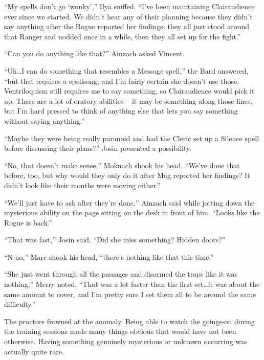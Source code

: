 “My spells don’t go ‘wonky’,” Ilya sniffed. “I’ve been maintaining Clairaudience ever since we started. We didn’t hear any of their planning because they didn’t say anything after the Rogue reported her findings: they all just stood around that Ranger and nodded once in a while, then they all set up for the fight.”

 

“Can you do anything like that?” Ainzach asked Vincent.

 

“Uh…I can do something that resembles a Message spell,” the Bard answered, “but that requires a spellsong, and I’m fairly certain she doesn’t use those. Ventriloquism still requires me to say something, so Clairaudience would pick it up. There are a lot of oratory abilities – it may be something along those lines, but I’m hard pressed to think of anything else that lets you say something without saying anything.”

 

“Maybe they were being really paranoid and had the Cleric set up a Silence spell before discussing their plans?” Josin presented a possibility.

 

“No, that doesn’t make sense,” Moknach shook his head. “We’ve done that before, too, but why would they only do it after Mag reported her findings? It didn’t look like their mouths were moving either.”

 

“We’ll just have to ask after they’re done,” Ainzach said while jotting down the mysterious ability on the page sitting on the desk in front of him. “Looks like the Rogue is back.”

 

“That was fast,” Josin said. “Did she miss something? Hidden doors?”

 

“N-no,” Mare shook his head, “there’s nothing like that this time.”

 

“She just went through all the passages and disarmed the traps like it was nothing,” Merry noted. “That was a lot faster than the first set…it was about the same amount to cover, and I’m pretty sure I set them all to be around the same difficulty.”

 

The proctors frowned at the anomaly. Being able to watch the goings-on during the training sessions made many things obvious that would have not been otherwise. Having something genuinely mysterious or unknown occurring was actually quite rare.

